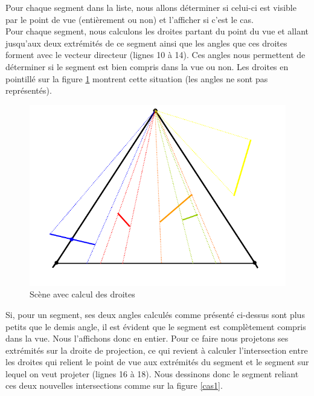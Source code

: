 \documentclass[11pt,a4paper]{article}
\theoremstyle{definition}
\theoremstyle{remark}
\begin{document}
Pour chaque segment dans la liste, nous allons déterminer si celui-ci est visible par le point de vue (entièrement ou non) et l'afficher si c'est le cas.\\

Pour chaque segment, nous calculons les droites partant du point du vue et allant jusqu'aux deux extrémités de ce segment ainsi que les angles que ces droites forment avec le vecteur directeur (lignes 10 à 14). Ces angles nous permettent de déterminer si le segment est bien compris dans la vue ou non. Les droites en pointillé sur la figure \ref{exp_3} montrent cette situation (les angles ne sont pas représentés).

\begin{figure}[H]
\centering
\includegraphics[scale=0.5]{inter.png}
\caption{Scène avec calcul des droites}
\label{exp_3}
\end{figure}

Si, pour un segment, ses deux angles calculés comme présenté ci-dessus sont plus petits que le demis angle, il est évident que le segment est complètement compris dans la vue. Nous l'affichons donc en entier. Pour ce faire nous projetons ses extrémités sur la droite de projection, ce qui revient à calculer l'intersection entre les droites qui relient le point de vue aux extrémités du segment et le segment sur lequel on veut projeter (lignes 16 à 18). Nous dessinons donc le segment reliant ces deux nouvelles intersections comme sur la figure \ref{cas1}.
\end{document}
